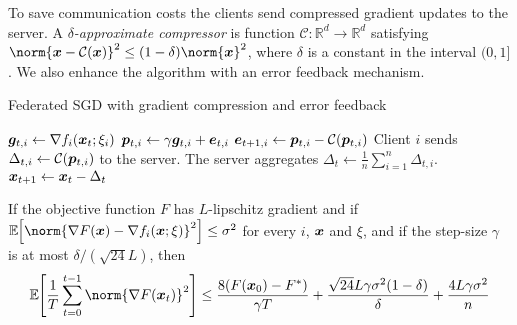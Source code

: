 \documentclass{article}
\begin{document}
To save communication costs the clients send compressed gradient updates to the server. A \emph{$\delta$-approximate compressor} is function $\mathcal C : \mathbb R^d \to \mathbb R^d$ satisfying $\norm{\xx - \mathcal C(\xx)}^2 \leq (1-\delta) \norm{\xx}^2$, where $\delta$ is a constant in the interval $(0, 1]$. We also enhance the algorithm with an error feedback mechanism.


\begin{algorithm}
  \caption{Federated SGD with gradient compression and error feedback}
  \begin{algorithmic}
    \State $\bm{g}_{t,i} \gets \nabla f_i(\bm{x}_t; \xi_i)$
    \State $\bm{p}_{t,i} \gets \gamma \bm{g}_{t,i} + \bm{e}_{t,i}$
    \State $\bm{e}_{t+1,i} \gets \bm{p}_{t,i} - \mathcal C(\bm{p}_{t,i})$
    \State Client $i$ sends $\Delta_{t,i} \gets \mathcal C(\bm{p}_{t,i})$ to the server.
    \EndFor
    \State The server aggregates $\Delta_t \gets \frac{1}{n} \sum_{i=1}^n \Delta_{t,i}$.
    \State $\bm{x}_{t+1} \gets \bm{x}_t - \Delta_t$
  \end{algorithmic}
\end{algorithm}



\begin{lemma}\label{lem:efsgd-convergence}
  If the objective function $F$ has $L$-lipschitz gradient and if $\expec{\norm{\nabla F(\xx) - \nabla f_i(\xx; \xi)}^2} \leq \sigma^2$ for every $i$, $\bm{x}$ and $\xi$, and if the step-size $\gamma$ is at most $\delta / (\sqrt{24} L)$, then
  \[
    \expec{\frac{1}{T} \sum_{t=0}^{t-1} \norm{\nabla F(\xx_t)}^2}
    \leq
    \frac{8(F(\xx_0) - F^\ast)}{\gamma T} + \frac{\sqrt{24} L \gamma \sigma^2 (1-\delta)}{\delta} + \frac{4 L \gamma \sigma^2}{n}
  \]
\end{lemma}
\end{document}
